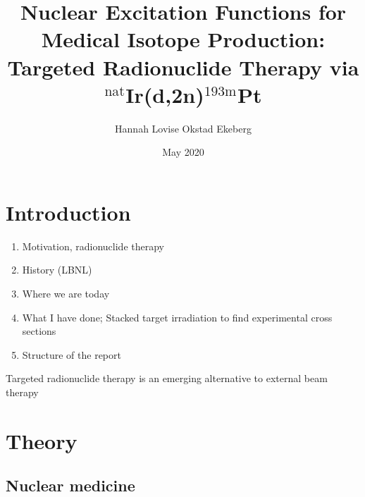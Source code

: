 \documentclass[a4paper,11pt,twoside]{book}
\title{Nuclear Excitation Functions for Medical Isotope Production: Targeted Radionuclide Therapy via $^{\text{nat}}$Ir(d,2n)$^{\text{193m}}$Pt}
\author{Hannah Lovise Okstad Ekeberg }
\date{May 2020}
\begin{document}
\maketitle

%
%
\tableofcontents
\newpage

\chapter{Introduction}\label{Chapter:Introduction}
\noindent




\noindent

\begin{enumerate}
    \item Motivation, radionuclide therapy
    \item History (LBNL)
    \item Where we are today 
    \item What I have done; Stacked target irradiation to find experimental cross sections
    \item Structure of the report
\end{enumerate}

Targeted radionuclide therapy is an emerging alternative to external beam therapy

\chapter{Theory}

\section{Nuclear medicine}
\end{document}
